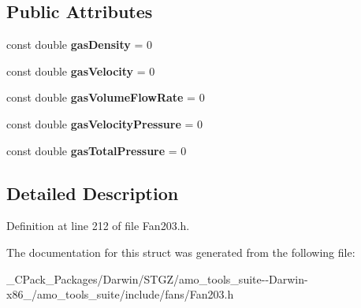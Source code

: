 \subsection*{Public Attributes}
\begin{DoxyCompactItemize}
\item 
\mbox{\label{struct_plane_data_1_1_node_binding_1_1_data_ab95d17426cc7d8141e904baf96a12340}} 
const double {\bfseries gas\+Density} = 0
\item 
\mbox{\label{struct_plane_data_1_1_node_binding_1_1_data_a334b80114bbe976623a7e24fbd546d51}} 
const double {\bfseries gas\+Velocity} = 0
\item 
\mbox{\label{struct_plane_data_1_1_node_binding_1_1_data_a5cbd28074d5a930f0267a9d60b83a04d}} 
const double {\bfseries gas\+Volume\+Flow\+Rate} = 0
\item 
\mbox{\label{struct_plane_data_1_1_node_binding_1_1_data_aa0892de35b2ecc840e2bcdca79f5d1a2}} 
const double {\bfseries gas\+Velocity\+Pressure} = 0
\item 
\mbox{\label{struct_plane_data_1_1_node_binding_1_1_data_a819380996458306f772c305df01d8dba}} 
const double {\bfseries gas\+Total\+Pressure} = 0
\end{DoxyCompactItemize}


\subsection{Detailed Description}


Definition at line 212 of file Fan203.\+h.



The documentation for this struct was generated from the following file\+:\begin{DoxyCompactItemize}
\item 
\+\_\+\+C\+Pack\+\_\+\+Packages/\+Darwin/\+S\+T\+G\+Z/amo\+\_\+tools\+\_\+suite-\/-\/\+Darwin-\/x86\+\_/amo\+\_\+tools\+\_\+suite/include/fans/Fan203.\+h\end{DoxyCompactItemize}
